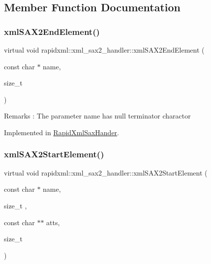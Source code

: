 \subsection{Member Function Documentation}
\mbox{\label{classrapidxml_1_1xml__sax2__handler_a330a65a04e36574c97f458e77ed42771}} 
\subsubsection{\texorpdfstring{xml\+S\+A\+X2\+End\+Element()}{xmlSAX2EndElement()}}
{\footnotesize\ttfamily virtual void rapidxml\+::xml\+\_\+sax2\+\_\+handler\+::xml\+S\+A\+X2\+End\+Element (\begin{DoxyParamCaption}\item[{const char $\ast$}]{name,  }\item[{size\+\_\+t}]{ }\end{DoxyParamCaption})\hspace{0.3cm}{\ttfamily [pure virtual]}}

\begin{DoxyRemark}{Remarks}
\+: The parameter \textquotesingle{}name\textquotesingle{} has null terminator charactor 
\end{DoxyRemark}


Implemented in \hyperlink{classRapidXmlSaxHander_ab04b6c22ac059dd4c42b0500ac246246}{Rapid\+Xml\+Sax\+Hander}.

\mbox{\label{classrapidxml_1_1xml__sax2__handler_afd825cb872693671d8dd4a6cd44f73c6}} 
\subsubsection{\texorpdfstring{xml\+S\+A\+X2\+Start\+Element()}{xmlSAX2StartElement()}}
{\footnotesize\ttfamily virtual void rapidxml\+::xml\+\_\+sax2\+\_\+handler\+::xml\+S\+A\+X2\+Start\+Element (\begin{DoxyParamCaption}\item[{const char $\ast$}]{name,  }\item[{size\+\_\+t}]{,  }\item[{const char $\ast$$\ast$}]{atts,  }\item[{size\+\_\+t}]{ }\end{DoxyParamCaption})\hspace{0.3cm}{\ttfamily [pure virtual]}}

